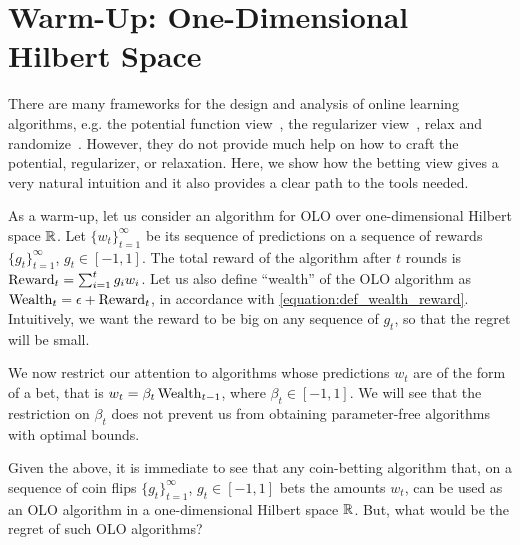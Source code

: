 \section{Warm-Up: One-Dimensional Hilbert Space}
\label{section:one-dimensional-hilbert-space-olo}

There are many frameworks for the design and analysis of online learning
algorithms, e.g. the potential function view~\cite{Cesa-Bianchi-Lugosi-2006},
the regularizer view~\cite{Shalev-Shwartz-2011}, relax and
randomize~\cite{Rakhlin-Shamir-Sridharan-2012}. However, they do not provide
much help on how to craft the potential, regularizer, or relaxation.  Here, we
show how the betting view gives a very natural intuition and it also provides a
clear path to the tools needed.

As a warm-up, let us consider an algorithm for OLO over one-dimensional Hilbert
space $\mathbb{R}$.  Let $\{w_t\}_{t=1}^\infty$ be its sequence of predictions on a
sequence of rewards $\{g_t\}_{t=1}^\infty$, $g_t \in [-1,1]$. The total reward
of the algorithm after $t$ rounds is $\operatorname{Reward}_t = \sum_{i=1}^t g_i w_i$.
Let us also define ``wealth'' of the OLO algorithm as $\operatorname{Wealth}_t = \epsilon +
\operatorname{Reward}_t$, in accordance with \eqref{equation:def_wealth_reward}.
Intuitively, we want the reward to be big on any sequence of $g_t$, so that
the regret will be small.

We now restrict our attention to algorithms whose
predictions $w_t$ are of the form of a bet, that is 
$
w_t = \beta_t \operatorname{Wealth}_{t-1}
$, where $\beta_t \in [-1,1]$.
We will see that the restriction on $\beta_t$ does not prevent us from obtaining
parameter-free algorithms with optimal bounds.

Given the above, it is immediate to see that any coin-betting
algorithm that, on a sequence of coin flips $\{g_t\}_{t=1}^\infty$, $g_t \in
[-1,1]$ bets the amounts $w_t$, can be used as an OLO
algorithm in a one-dimensional Hilbert space $\mathbb{R}$. But, what would be the regret of such OLO algorithms?

